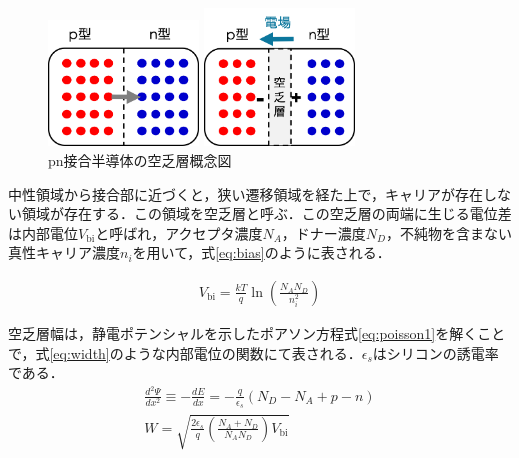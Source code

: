 \begin{figure}[h]
  \centering
  \begin{minipage}[b]{0.45\linewidth}
    \centering
    \includegraphics[width=4cm]{./figure/semiku1.png}
  \end{minipage}
  \begin{minipage}[b]{0.45\linewidth}
    \centering
    \includegraphics[width=4cm]{./figure/semiku2.png}
  \end{minipage}
  \caption{pn接合半導体の空乏層概念図}
  \label{fig:pn}
\end{figure}


中性領域から接合部に近づくと，狭い遷移領域を経た上で，キャリアが存在しない領域が存在する．この領域を空乏層と呼ぶ．この空乏層の両端に生じる電位差は内部電位$V_{\mathrm{bi}}$と呼ばれ，アクセプタ濃度$N_A$，ドナー濃度$N_D$，不純物を含まない真性キャリア濃度$n_i$を用いて，式\ref{eq:bias}のように表される．\par
\begin{eqnarray}
  \label{eq:bias}
  V_{\mathrm{bi}} = \frac{kT}{q} \ln \left( \frac{N_A N_D}{n_i^2} \right) 
\end{eqnarray}

空乏層幅は，静電ポテンシャルを示したポアソン方程式\ref{eq:poisson1}を解くことで，式\ref{eq:width}のような内部電位の関数にて表される．$\epsilon_s$はシリコンの誘電率である．
\begin{eqnarray}
  \label{eq:poisson1}
  \frac{d^2\Psi}{dx^2} \equiv -\frac{dE}{dx} = - \frac{q}{\epsilon_s}(N_D - N_A + p - n) \\
  \label{eq:width}
  W = \sqrt{ \frac{2\epsilon_s}{q} \left( \frac{N_A+N_D}{N_A N_D} \right) V_{\mathrm{bi}}}
\end{eqnarray}

